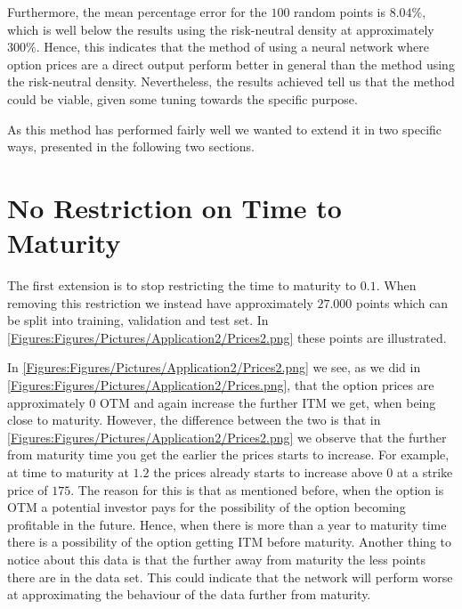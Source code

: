 
Furthermore, the mean percentage error for the $100$ random points is $8.04\%$, which is well below the results using the risk-neutral density at approximately $300\%$. Hence, this indicates that the method of using a neural network where option prices are a direct output perform better in general than the method using the risk-neutral density. Nevertheless, the results achieved tell us that the method could be viable, given some tuning towards the specific purpose.

As this method has performed fairly well we wanted to extend it in two specific ways, presented in the following two sections.  

\section{No Restriction on Time to Maturity} \label{sec:no_restric}
The first extension is to stop restricting the time to maturity to $0.1$. When removing this restriction we instead have approximately $27.000$ points which can be split into training, validation and test set. In \autoref{Figures:Figures/Pictures/Application2/Prices2.png} these points are illustrated. 


In \autoref{Figures:Figures/Pictures/Application2/Prices2.png} we see, as we did in \autoref{Figures:Figures/Pictures/Application2/Prices.png}, that the option prices are approximately $0$ OTM and again increase the further ITM we get, when being close to maturity. However, the difference between the two is that in \autoref{Figures:Figures/Pictures/Application2/Prices2.png} we observe that the further from maturity time you get the earlier the prices starts to increase. For example, at time to maturity at $1.2$ the prices already starts to increase above $0$ at a strike price of $175$. The reason for this is that as mentioned before, when the option is OTM a potential investor pays for the possibility of the option becoming profitable in the future. Hence, when there is more than a year to maturity time there is a possibility of the option getting ITM before maturity. Another thing to notice about this data is that the further away from maturity the less points there are in the data set. This could indicate that the network will perform worse at approximating the behaviour of the data further from maturity. 

